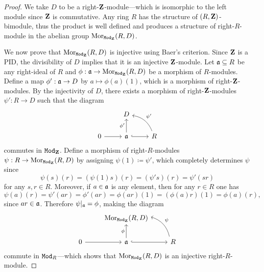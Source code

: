 \begin{proof}
    We take \(D\) to be a right-\(\mathbf{Z}\)-module---which is isomorphic to the left
    module since \(\mathbf{Z}\) is commutative. Any ring \(R\) has the structure of
    \((R, \mathbf{Z})\)-bimodule, thus the product is well defined and produces a structure
    of right-\(R\)-module in the abelian group \(\operatorname{Mor}_{{\texttt{Mod}_{\mathbf{Z}}}}(R, D)\).

    We now prove that \(\operatorname{Mor}_{{\texttt{Mod}_{\mathbf{Z}}}}(R, D)\) is injective using Baer's
    criterion. Since \(\mathbf{Z}\) is a PID, the divisibility of \(D\) implies that it is
    an injective \(\mathbf{Z}\)-module. Let \(\mathfrak{a} \subseteq R\) be any right-ideal of
    \(R\) and \(\phi: \mathfrak{a} \to \operatorname{Mor}_{{\texttt{Mod}_{\mathbf{Z}}}}(R, D)\) be a morphism of
    \(R\)-modules. Define a map \(\phi': \mathfrak{a} \to D\) by
    \(a \mapsto \phi(a)(1)\), which is a morphism of right-\(\mathbf{Z}\)-modules. By the
    injectivity of \(D\), there exists a morphism of right-\(\mathbf{Z}\)-modules
    \(\psi': R \to D\) such that the diagram
    \[
        \begin{tikzcd}
            &D &
            \\
            0 \ar[r] &\ideal a \ar[u, "\phi'"] \ar[r, hook]
            &R \ar[lu, "\psi'"', bend right]
        \end{tikzcd}
    \]
    commutes in \({\texttt{Mod}_{\mathbf{Z}}}\). Define a morphism of right-\(R\)-modules
    \(\psi: R \to \operatorname{Mor}_{{\texttt{Mod}_{\mathbf{Z}}}}(R, D)\) by assigning \(\psi(1) \coloneq \psi'\),
    which completely determines \(\psi\) since
    \[
        \psi(s)(r) = (\psi(1) s) (r) = (\psi' s)(r) = \psi'(s r)
    \]
    for any \(s, r \in R\). Moreover, if \(a \in \mathfrak{a}\) is any element, then for
    any \(r \in R\) one has
    \[
        \psi(a)(r)
        = \psi'(a r)
        = \phi'(a r)
        = \phi(a r)(1)
        = (\phi(a) r)(1)
        = \phi(a)(r),
    \]
    since \(a r \in \mathfrak{a}\). Therefore \(\psi|_{\mathfrak{a}} = \phi\), making the
    diagram
    \[
        \begin{tikzcd}
            &\Hom_{\rMod{\Z}}(R, D) &
            \\
            0 \ar[r] &\ideal a \ar[u, "\phi"] \ar[r, hook]
            &R \ar[lu, "\psi"', bend right]
        \end{tikzcd}
    \]
    commute in \({\texttt{Mod}_{R}}\)---which shows that \(\operatorname{Mor}_{{\texttt{Mod}_{\mathbf{Z}}}}(R, D)\) is an
    injective right-\(R\)-module.
\end{proof}

